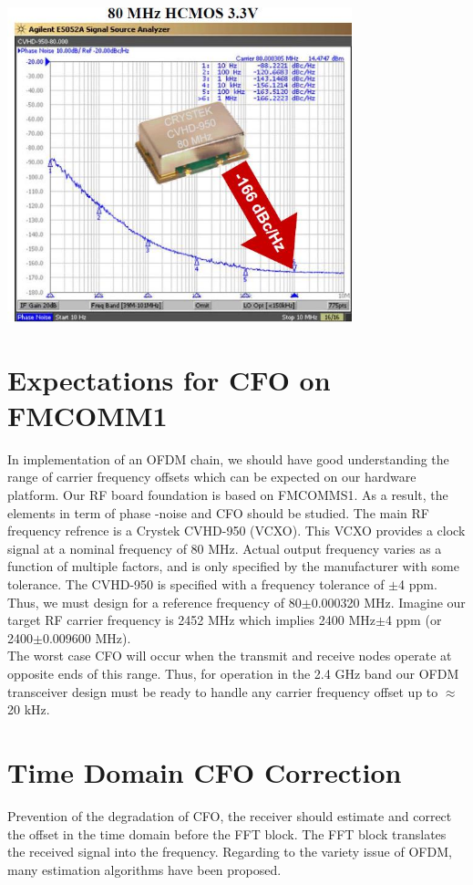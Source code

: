 \begin{center}
\includegraphics[width=10cm]{content/fig/cvhd.JPG}
\end{center}


\section{Expectations for CFO on FMCOMM1}

In implementation of an OFDM chain, we should have good understanding the range of carrier frequency offsets which can be expected on our hardware platform. Our RF board foundation is based on FMCOMMS1. As a result, the elements in term of phase -noise and CFO should be studied. The main RF frequency refrence is a Crystek CVHD-950 (VCXO). This VCXO provides a clock signal at a nominal frequency of 80 MHz. Actual output frequency varies as a function of multiple factors, and is only specified by the manufacturer with some tolerance. The CVHD-950 is specified with a frequency tolerance of $\pm$4 ppm. Thus, we must design for a reference frequency of 80$\pm$0.000320 MHz. Imagine our target RF carrier frequency is 2452 MHz which implies 2400 MHz$\pm$4 ppm (or 2400$\pm$0.009600 MHz).\\
The worst case CFO will occur when the transmit and receive nodes operate at opposite ends of this range. Thus, for operation in the 2.4 GHz band our OFDM transceiver design must be ready to handle any carrier frequency offset up to $\approx$20 kHz.


\section{Time Domain CFO Correction}
Prevention of the degradation of CFO, the receiver should estimate and correct the offset in the time domain before the FFT block. The FFT block translates the received signal into the frequency. Regarding to the variety issue of OFDM, many estimation algorithms have been proposed.\\

